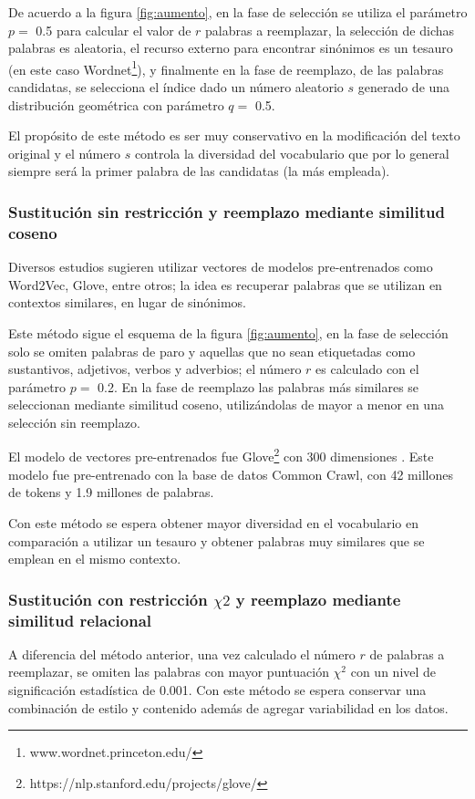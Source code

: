 De acuerdo a la figura \ref{fig:aumento}, en la fase de selección se utiliza el parámetro $p=$ 0.5 para calcular el valor de $r$ palabras a reemplazar, la selección de dichas palabras es aleatoria, el recurso externo para encontrar sinónimos es un tesauro (en este caso Wordnet\footnote{www.wordnet.princeton.edu/}), y finalmente en la fase de reemplazo, de las palabras candidatas, se selecciona el índice dado un número aleatorio $s$ generado de una distribución geométrica con parámetro $q=$ 0.5.

El propósito de este método es ser muy conservativo en la modificación del texto original y el número $s$ controla la diversidad del vocabulario que por lo general siempre será la primer palabra de las candidatas (la más empleada).

\subsubsection{Sustitución sin restricción y reemplazo mediante similitud coseno}
Diversos estudios sugieren utilizar vectores de modelos pre-entrenados como Word2Vec, Glove, entre otros; la idea es recuperar palabras que se utilizan en contextos similares, en lugar de sinónimos. 

Este método sigue el esquema de la figura \ref{fig:aumento}, en la fase de selección solo se omiten palabras de paro y aquellas que no sean etiquetadas como sustantivos, adjetivos, verbos y adverbios; el número $r$ es calculado con el parámetro $p=$ 0.2. En la fase de reemplazo las palabras más similares se seleccionan mediante similitud coseno, utilizándolas de mayor a menor en una selección sin reemplazo.

El modelo de vectores pre-entrenados fue Glove\footnote{https://nlp.stanford.edu/projects/glove/} con 300 dimensiones \cite{pennington2014glove}. Este modelo fue pre-entrenado con la base de datos Common Crawl, con 42 millones de  tokens y 1.9 millones de palabras. 

Con este método se espera obtener mayor diversidad en el vocabulario en comparación a utilizar un tesauro y obtener palabras muy similares que se emplean en el mismo contexto.

\subsubsection{Sustitución con restricción $\chi2$  y reemplazo mediante similitud relacional}
A diferencia del método anterior, una vez calculado el número $r$ de palabras a reemplazar, se omiten las palabras con mayor puntuación $\chi^2$ con un nivel de significación estadística de 0.001. Con este método se espera conservar una combinación de estilo y contenido además de agregar variabilidad en los datos.


